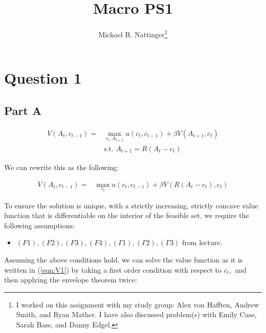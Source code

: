 \documentclass[11pt]{article} %
\title{Macro PS1}
\author{Michael B. Nattinger\footnote{I worked on this assignment with my study group: Alex von Hafften, Andrew Smith, and Ryan Mather. I have also discussed problem(s) with Emily Case, Sarah Bass, and Danny Edgel.}}
\begin{document}
\maketitle
\section{Question 1}
\subsection{Part A}
\begin{align*}
V(A_t,c_{t-1}) = &\max_{c_t,A_{t+1}} u(c_t,c_{t-1}) + \beta V(A_{t+1},c_t)\\
&\text{s.t. } A_{t+1} = R(A_t - c_t)
\end{align*}

We can rewrite this as the following:

\begin{align}
V(A_t,c_{t-1}) = &\max_{c_t} u(c_t,c_{t-1}) + \beta V(R(A_t - c_t),c_t) \label{eqn:V1}%
\end{align}

To ensure the solution is unique, with a strictly increasing, strictly concave value function that is differentiable on the interior of the feasible set, we require the following assumptions:
\begin{itemize}
\item $(F1),(F2),(F3),(F4),(\Gamma 1),(\Gamma 2), (\Gamma 3)$ from lecture.
\end{itemize}

Assuming the above conditions hold, we can solve the value function as it is written in (\ref{eqn:V1}) by taking a first order condition with respect to $c_t,$ and then applying the envelope theorem twice:
\end{document}
